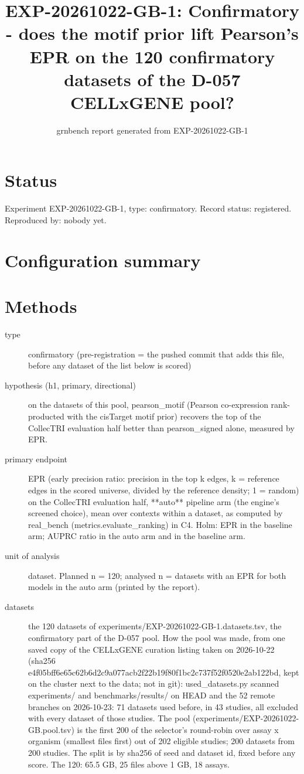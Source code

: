 \documentclass{article}
\title{EXP-20261022-GB-1: Confirmatory - does the motif prior lift Pearson's EPR on the 120 confirmatory datasets of the D-057 CELLxGENE pool?}
\author{grnbench report generated from EXP-20261022-GB-1}
\date{}
\begin{document}
\maketitle
\section*{Status}
Experiment EXP-20261022-GB-1, type: confirmatory. Record status: registered. Reproduced by: nobody yet.
\section{Configuration summary}

\section{Methods}
\begin{description}
\item[type] confirmatory (pre-registration = the pushed commit that adds this file, before any dataset of the list below is scored)
\item[hypothesis (h1, primary, directional)] on the datasets of this pool, pearson\_motif (Pearson co-expression rank-producted with the cisTarget motif prior) recovers the top of the CollecTRI evaluation half better than pearson\_signed alone, measured by EPR.
\item[primary endpoint] EPR (early precision ratio: precision in the top k edges, k = reference edges in the scored universe, divided by the reference density; 1 = random) on the CollecTRI evaluation half, **auto** pipeline arm (the engine's screened choice), mean over contexts within a dataset, as computed by real\_bench (metrics.evaluate\_ranking) in C4. Holm: EPR in the baseline arm; AUPRC ratio in the auto arm and in the baseline arm.
\item[unit of analysis] dataset. Planned n = 120; analysed n = datasets with an EPR for both models in the auto arm (printed by the report).
\item[datasets] the 120 datasets of experiments/EXP-20261022-GB-1.datasets.tsv, the confirmatory part of the D-057 pool. How the pool was made, from one saved copy of the CELLxGENE curation listing taken on 2026-10-22 (sha256 e4f05bff6e65c62b6d2c9a077acb2f22b19f80f1bc2c737f52f0520e2ab122bd, kept on the cluster next to the data; not in git): used\_datasets.py scanned experiments/ and benchmarks/results/ on HEAD and the 52 remote branches on 2026-10-23: 71 datasets used before, in 43 studies, all excluded with every dataset of those studies. The pool (experiments/EXP-20261022-GB.pool.tsv) is the first 200 of the selector's round-robin over assay x organism (smallest files first) out of 202 eligible studies; 200 datasets from 200 studies. The split is by sha256 of seed and dataset id, fixed before any score. The 120: 65.5 GB, 25 files above 1 GB, 18 assays.

\end{description}
\end{document}
